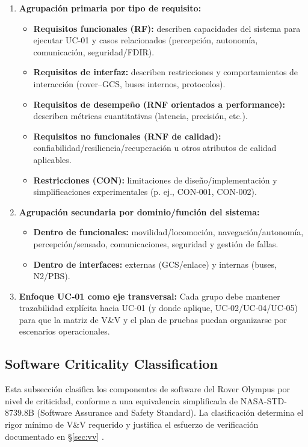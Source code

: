 \begin{enumerate}
    \item \textbf{Agrupación primaria por tipo de requisito:}
    \begin{itemize}
        \item \textbf{Requisitos funcionales (RF):} describen capacidades del sistema para ejecutar UC‑01 y casos relacionados (percepción, autonomía, comunicación, seguridad/FDIR).
        \item \textbf{Requisitos de interfaz:} describen restricciones y comportamientos de interacción (rover–GCS, buses internos, protocolos).
        \item \textbf{Requisitos de desempeño (RNF orientados a performance):} describen métricas cuantitativas (latencia, precisión, etc.).
        \item \textbf{Requisitos no funcionales (RNF de calidad):} confiabilidad/resiliencia/recuperación u otros atributos de calidad aplicables.
        \item \textbf{Restricciones (CON):} limitaciones de diseño/implementación y simplificaciones experimentales (p. ej., CON‑001, CON‑002).
    \end{itemize}

    \item \textbf{Agrupación secundaria por dominio/función del sistema:}
    \begin{itemize}
        \item \textbf{Dentro de funcionales:} movilidad/\allowbreak locomoción, navegación/\allowbreak autonomía, percepción/\allowbreak sensado, comunicaciones, seguridad y gestión de fallas.
        \item \textbf{Dentro de interfaces:} externas (GCS/enlace) y internas (buses, N2/PBS).
    \end{itemize}

    \item \textbf{Enfoque UC‑01 como eje transversal:} Cada grupo debe mantener trazabilidad explícita hacia UC‑01 (y donde aplique, UC‑02/UC‑04/UC‑05) para que la matriz de V\&V y el plan de pruebas puedan organizarse por escenarios operacionales.
\end{enumerate}

\subsection{Software Criticality Classification}\label{subsec:sw_criticality}

Esta subsección clasifica los componentes de software del Rover Olympus por nivel de criticidad, conforme a una equivalencia simplificada de NASA-STD-8739.8B (Software Assurance and Safety Standard). La clasificación determina el rigor mínimo de V\&V requerido y justifica el esfuerzo de verificación documentado en \S\ref{sec:vv} \cite{nasa_std_8739_8}.

